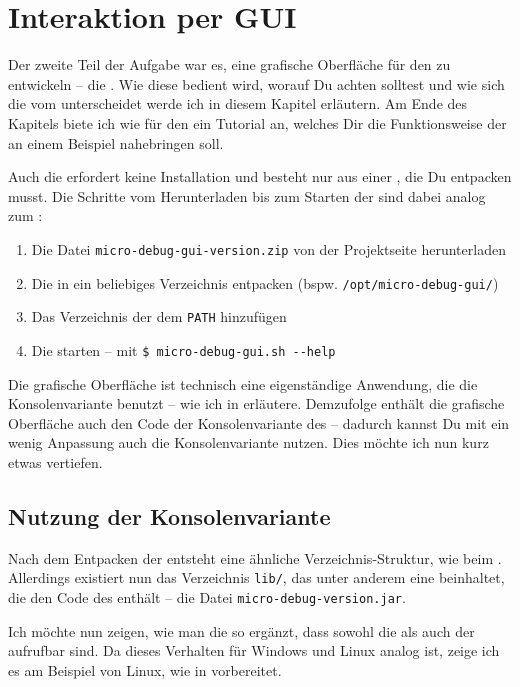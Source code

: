 \chapter{Interaktion per GUI}
Der zweite Teil der Aufgabe war es, eine grafische Oberfläche für den \md zu entwickeln -- die \mdg. Wie diese bedient wird, worauf Du achten solltest und wie sich die \mdg vom \md unterscheidet werde ich in diesem Kapitel erläutern. Am Ende des Kapitels biete ich wie für den \md ein Tutorial an, welches Dir die Funktionsweise der \mdg an einem Beispiel nahebringen soll.

Auch die \mdg erfordert keine Installation und besteht nur aus einer , die Du entpacken musst. Die Schritte vom Herunterladen bis zum Starten der \mdg sind dabei analog zum \md:

\begin{enumerate}
\item Die Datei \texttt{micro-debug-gui-version.zip} von der Projektseite herunterladen
\item Die  in ein beliebiges Verzeichnis entpacken (bspw. \texttt{/opt/micro-debug-gui/})
\item Das Verzeichnis der \mdg dem \texttt{PATH} hinzufügen
\item Die \mdg starten -- mit \texttt{\$ micro-debug-gui.sh -{}-help}
\end{enumerate}

Die grafische Oberfläche ist technisch eine eigenständige Anwendung, die die Konsolenvariante benutzt -- wie ich in  erläutere. Demzufolge enthält die grafische Oberfläche auch den Code der Konsolenvariante des \md -- dadurch kannst Du mit ein wenig Anpassung auch die Konsolenvariante nutzen. Dies möchte ich nun kurz etwas vertiefen.

\section{Nutzung der Konsolenvariante}
Nach dem Entpacken der  entsteht eine ähnliche Verzeichnis-Struktur, wie beim \md. Allerdings existiert nun das Verzeichnis \texttt{lib/}, das unter anderem eine  beinhaltet, die den Code des \md enthält -- die Datei \texttt{micro-debug-version.jar}.

Ich möchte nun zeigen, wie man die \mdg so ergänzt, dass sowohl die \mdg als auch der \md aufrufbar sind. Da dieses Verhalten für Windows und Linux analog ist, zeige ich es am Beispiel von Linux, wie in  vorbereitet.


